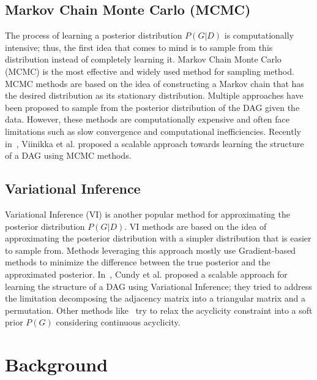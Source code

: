 \documentclass{lxaiproposal}
\begin{document}
    \subsection{Markov Chain Monte Carlo (MCMC)}
    \vspace*{-3mm}
    The process of learning a posterior distribution $P(G|D)$ is computationally intensive; thus, the first idea that
    comes to mind is to sample from this distribution instead of completely learning it. Markov Chain Monte Carlo (MCMC)
    is the most effective and widely used method for sampling method. MCMC methods are based on the idea of constructing
    a Markov chain that has the desired distribution as its stationary distribution. Multiple approaches \cite{
        mcmc1, mcmc2, mcmc3} have been proposed to sample from the posterior distribution of the DAG given the data.
    However, these methods are computationally expensive and often face limitations such as slow convergence and
    computational inefficiencies. Recently in~\cite{viinikka2020scalablebayesianlearningcausal}, Viinikka et al. proposed a scalable approach towards
    learning the structure of a DAG using MCMC methods.

    \subsection{Variational Inference}
    \vspace*{-3mm}

    Variational Inference (VI) is another popular method for approximating the posterior distribution $P(G|D)$. VI
    methods are based on the idea of approximating the posterior distribution with a simpler distribution that is easier
    to sample from. Methods leveraging this approach mostly use Gradient-based methods to minimize the difference
    between the true posterior and the approximated posterior. In~\cite{cundy2021bcdnetsscalablevariational}, Cundy et al. proposed a scalable
    approach for learning the structure of a DAG using Variational Inference; they tried to address the limitation
    decomposing the adjacency matrix into a triangular matrix and a permutation. Other methods like~\cite{annadani2021variationalcausalnetworksapproximate, lorch2021dibsdifferentiablebayesianstructure}
    try to relax the acyclicity constraint into a soft prior $P(G)$ considering continuous acyclicity.


    \section{Background}\label{sec:background}
    \vspace*{-3mm}
\end{document}
